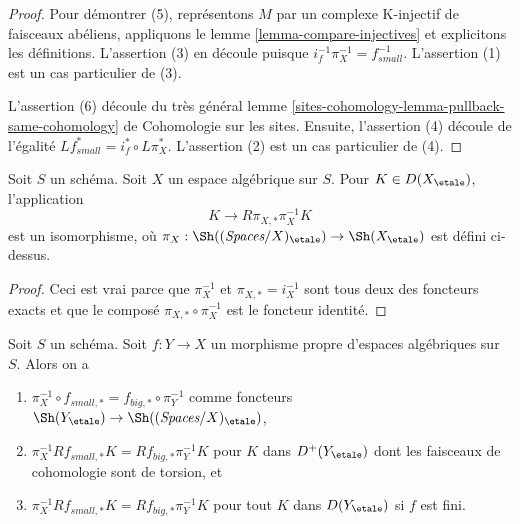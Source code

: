 \begin{proof}
Pour démontrer (5), représentons $M$ par un complexe K-injectif de faisceaux
abéliens, appliquons le lemme \ref{lemma-compare-injectives} et explicitons
les définitions. L'assertion (3) en découle puisque
$i_f^{-1}\pi_X^{-1} = f_{small}^{-1}$. L'assertion (1) est un cas
particulier de (3).

\medskip\noindent
L'assertion (6) découle du très général lemme
\ref{sites-cohomology-lemma-pullback-same-cohomology} de Cohomologie sur les
sites. Ensuite, l'assertion (4) découle de l'égalité
$Lf_{small}^* = i_f^* \circ L\pi_X^*$. L'assertion (2) est un cas particulier
de (4).
\end{proof}

\begin{lemma}
\label{lemma-cohomological-descent-etale}
Soit $S$ un schéma. Soit $X$ un espace algébrique sur $S$.
Pour $K \in D(X_\etale)$, l'application
$$
K \longrightarrow R\pi_{X, *}\pi_X^{-1}K
$$
est un isomorphisme, où
$\pi_X : \Sh((\textit{Spaces}/X)_\etale) \to \Sh(X_\etale)$ est défini ci-dessus.
\end{lemma}

\begin{proof}
Ceci est vrai parce que $\pi_X^{-1}$ et $\pi_{X, *} = i_X^{-1}$ sont tous deux
des foncteurs exacts et que le composé $\pi_{X, *} \circ \pi_X^{-1}$
est le foncteur identité.
\end{proof}

\begin{lemma}
\label{lemma-compare-higher-direct-image-proper}
Soit $S$ un schéma.
Soit $f : Y \to X$ un morphisme propre d'espaces algébriques sur $S$.
Alors on a
\begin{enumerate}
\item $\pi_X^{-1} \circ f_{small, *} = f_{big, *} \circ \pi_Y^{-1}$
comme foncteurs $\Sh(Y_\etale) \to \Sh((\textit{Spaces}/X)_\etale)$,
\item $\pi_X^{-1}Rf_{small, *}K = Rf_{big, *}\pi_Y^{-1}K$
pour $K$ dans $D^+(Y_\etale)$ dont les faisceaux de cohomologie sont de torsion, et
\item $\pi_X^{-1}Rf_{small, *}K = Rf_{big, *}\pi_Y^{-1}K$
pour tout $K$ dans $D(Y_\etale)$ si $f$ est fini.
\end{enumerate}
\end{lemma}

